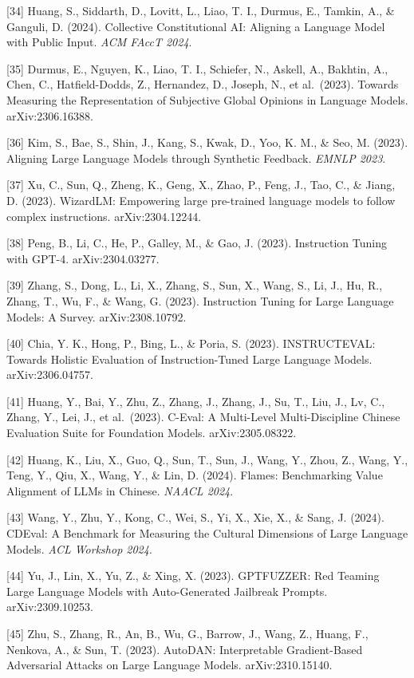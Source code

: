 {[}34{]} Huang, S., Siddarth, D., Lovitt, L., Liao, T. I., Durmus, E., Tamkin, A., \& Ganguli, D. (2024). Collective Constitutional AI: Aligning a Language Model with Public Input. \emph{ACM FAccT 2024}.

{[}35{]} Durmus, E., Nguyen, K., Liao, T. I., Schiefer, N., Askell, A., Bakhtin, A., Chen, C., Hatfield-Dodds, Z., Hernandez, D., Joseph, N., et al.~(2023). Towards Measuring the Representation of Subjective Global Opinions in Language Models. arXiv:2306.16388.

{[}36{]} Kim, S., Bae, S., Shin, J., Kang, S., Kwak, D., Yoo, K. M., \& Seo, M. (2023). Aligning Large Language Models through Synthetic Feedback. \emph{EMNLP 2023}.

{[}37{]} Xu, C., Sun, Q., Zheng, K., Geng, X., Zhao, P., Feng, J., Tao, C., \& Jiang, D. (2023). WizardLM: Empowering large pre-trained language models to follow complex instructions. arXiv:2304.12244.

{[}38{]} Peng, B., Li, C., He, P., Galley, M., \& Gao, J. (2023). Instruction Tuning with GPT-4. arXiv:2304.03277.

{[}39{]} Zhang, S., Dong, L., Li, X., Zhang, S., Sun, X., Wang, S., Li, J., Hu, R., Zhang, T., Wu, F., \& Wang, G. (2023). Instruction Tuning for Large Language Models: A Survey. arXiv:2308.10792.

{[}40{]} Chia, Y. K., Hong, P., Bing, L., \& Poria, S. (2023). INSTRUCTEVAL: Towards Holistic Evaluation of Instruction-Tuned Large Language Models. arXiv:2306.04757.

{[}41{]} Huang, Y., Bai, Y., Zhu, Z., Zhang, J., Zhang, J., Su, T., Liu, J., Lv, C., Zhang, Y., Lei, J., et al.~(2023). C-Eval: A Multi-Level Multi-Discipline Chinese Evaluation Suite for Foundation Models. arXiv:2305.08322.

{[}42{]} Huang, K., Liu, X., Guo, Q., Sun, T., Sun, J., Wang, Y., Zhou, Z., Wang, Y., Teng, Y., Qiu, X., Wang, Y., \& Lin, D. (2024). Flames: Benchmarking Value Alignment of LLMs in Chinese. \emph{NAACL 2024}.

{[}43{]} Wang, Y., Zhu, Y., Kong, C., Wei, S., Yi, X., Xie, X., \& Sang, J. (2024). CDEval: A Benchmark for Measuring the Cultural Dimensions of Large Language Models. \emph{ACL Workshop 2024}.

{[}44{]} Yu, J., Lin, X., Yu, Z., \& Xing, X. (2023). GPTFUZZER: Red Teaming Large Language Models with Auto-Generated Jailbreak Prompts. arXiv:2309.10253.

{[}45{]} Zhu, S., Zhang, R., An, B., Wu, G., Barrow, J., Wang, Z., Huang, F., Nenkova, A., \& Sun, T. (2023). AutoDAN: Interpretable Gradient-Based Adversarial Attacks on Large Language Models. arXiv:2310.15140.

